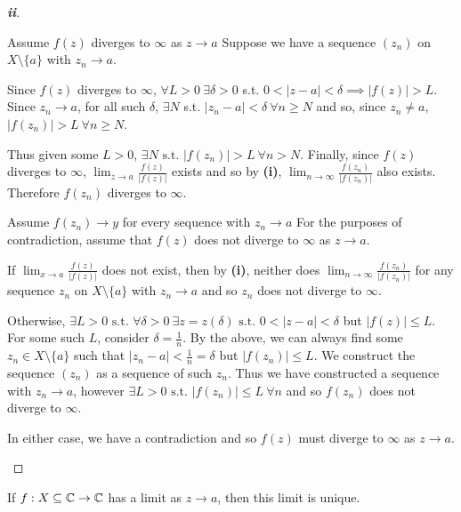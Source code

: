\documentclass[../main.tex]{subfiles}
\begin{document}
\begin{proof}[\textbf{ii}]
  \begin{proofdirection}{Assume $f(z)$ diverges to $\infty$ as $z \to a$}
    Suppose we have a sequence $(z_n)$ on $X \setminus \{a\}$ with $z_n \to a$.

    Since $f(z)$ diverges to $\infty$, $\forall L > 0\ \exists \delta > 0$ s.t. $0 < |z - a| < \delta \implies |f(z)| > L$.
    Since $z_n \to a$, for all such $\delta$, $\exists N$ s.t. $|z_n - a| < \delta\ \forall n \geq N$ and so, since $z_n \neq a$, $|f(z_n)| > L\ \forall n \geq N$.

    Thus given some $L > 0$, $\exists N \text{ s.t. } |f(z_n)| > L\ \forall n > N$.
    Finally, since $f(z)$ diverges to $\infty$, $\lim_{z \to a} \frac{f(z)}{|f(z)|}$ exists and so by \textbf{(i)}, $\lim_{n \to \infty} \frac{f(z_n)}{|f(z_n)|}$ also exists.
    Therefore $f(z_n)$ diverges to $\infty$.
  \end{proofdirection}
  \begin{proofdirection}{Assume $f(z_n) \to y$ for every sequence with $z_n \to a$}
    For the purposes of contradiction, assume that $f(z)$ does not diverge to $\infty$ as $z \to a$.

    If $\lim_{x \to a} \frac{f(z)}{|f(z)|}$ does not exist, then by \textbf{(i)}, neither does $\lim_{n \to \infty} \frac{f(z_n)}{|f(z_n)|}$ for any sequence $z_n$ on $X \setminus \{a\}$ with $z_n \to a$ and so $z_n$ does not diverge to $\infty$.

    Otherwise, $\exists L > 0 \text{ s.t. } \forall \delta > 0\ \exists z = z(\delta) \text{ s.t. } 0 < |z - a| < \delta$ but $|f(z)| \leq L$.
    For some such $L$, consider $\delta = \frac{1}{n}$.
    By the above, we can always find some $z_n \in X \setminus \{a\}$ such that $|z_n - a| < \frac{1}{n} = \delta$ but $|f(z_n)| \leq L$.
    We construct the sequence $(z_n)$ as a sequence of such $z_n$.
    Thus we have constructed a sequence with $z_n \to a$, however $\exists L > 0 \text{ s.t. } |f(z_n)| \leq L\ \forall n$ and so $f(z_n)$ does not diverge to $\infty$.

    In either case, we have a contradiction and so $f(z)$ must diverge to $\infty$ as $z \to a$.
  \end{proofdirection}
\end{proof}
\begin{lemma}
  If $f: X \subseteq \mathbb{C} \to \mathbb{C}$ has a limit as $z \to a$, then this limit is unique.
\end{lemma}
\end{document}
